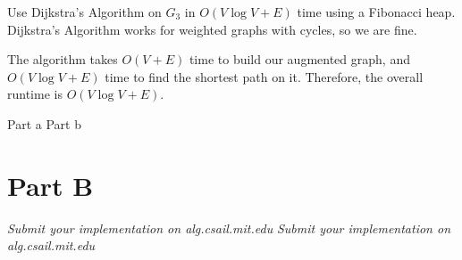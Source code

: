 \documentclass[12pt,twoside]{article}
\begin{document}
\begin{problems}
\begin{problemparts}
Use Dijkstra's Algorithm on $G_3$ in $O(V\log V + E)$ time using a Fibonacci heap. Dijkstra's Algorithm works for weighted graphs with cycles, so we are fine.

The algorithm takes $O(V + E)$ time to build our augmented graph, and $O(V\log V + E)$ time to find the shortest path on it. Therefore, the overall runtime is $O(V\log V + E)$.

\end{problemparts}

\problem  %

\begin{problemparts}
\problempart Part a %
\problempart Part b %
\end{problemparts}

\section*{Part B}

\problem
\begin{problemparts}
\problempart \emph{Submit your implementation on alg.csail.mit.edu}
\problempart \emph{Submit your implementation on alg.csail.mit.edu}
\end{problemparts}

\end{problems}
\end{document}
